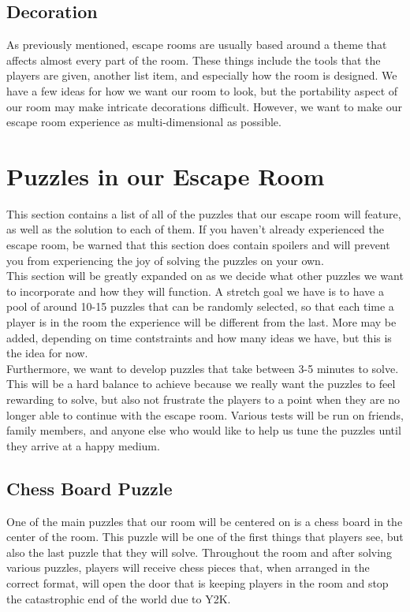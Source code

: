 \documentclass[conference]{IEEEtran}
\begin{document}
\subsection*{Decoration}
As previously mentioned, escape rooms are usually based around a theme that affects almost
every part of the room. These things include the tools that the players are given, another list item,
and especially how the room is designed. We have a few ideas for how we want our room to look, but
the portability aspect of our room may make intricate decorations difficult. However, we want to make
our escape room experience as multi-dimensional as possible.


\section{Puzzles in our Escape Room}
This section contains a list of all of the puzzles that our escape room will feature, as well as
the solution to each of them. If you haven't already experienced the escape room, be warned that
this section does contain spoilers and will prevent you from experiencing the joy of solving the
puzzles on your own.
\\
\indent This section will be greatly expanded on as we decide what other puzzles we want to incorporate and how they will function.
A stretch goal we have is to have a pool of around 10-15 puzzles that can be randomly selected, so that each time a player is in the
room the experience will be different from the last. More may be added, depending on time contstraints and how many ideas we
have, but this is the idea for now.
\\
\indent Furthermore, we want to develop puzzles that take between 3-5 minutes to solve. This will be a hard balance
to achieve because we really want the puzzles to feel rewarding to solve, but also not frustrate the players
to a point when they are no longer able to continue with the escape room. Various tests will be run on friends, family members,
and anyone else who would like to help us tune the puzzles until they arrive at a happy medium.


\subsection{Chess Board Puzzle}
One of the main puzzles that our room will be centered on is a chess board in the center of the room.
This puzzle will be one of the first things that players see, but also the last puzzle that they will solve.
Throughout the room and after solving various puzzles, players will receive chess pieces that, when
arranged in the correct format, will open the door that is keeping players in the room and stop the
catastrophic end of the world due to Y2K.
\end{document}
